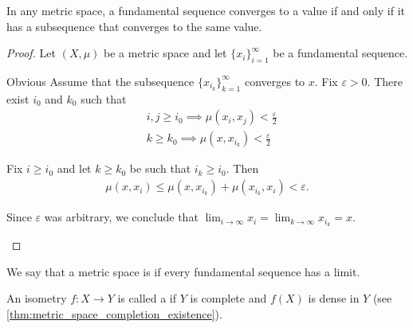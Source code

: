 \begin{proposition}\label{thm:fundamental_subsequence_convergence}
  In any metric space, a fundamental sequence converges to a value if and only if it has a subsequence that converges to the same value.
\end{proposition}
\begin{proof}
  Let \( (X, \mu) \) be a metric space and let \( \{ x_i \}_{i=1}^\infty \) be a fundamental sequence.

  \begin{description}
    \Implies Obvious
    \ImpliedBy Assume that the subsequence \( \{ x_{i_k} \}_{k=1}^\infty \) converges to \( x \). Fix \( \varepsilon > 0 \). There exist \( i_0 \) and \( k_0 \) such that
    \begin{align*}
      &i, j \geq i_0 \implies \mu(x_i, x_j) < \tfrac \varepsilon 2 \\
      &k \geq k_0 \implies \mu(x, x_{i_k}) < \tfrac \varepsilon 2
    \end{align*}

    Fix \( i \geq i_0 \) and let \( k \geq k_0 \) be such that \( i_k \geq i_0 \). Then
    \begin{align*}
      \mu(x, x_i) \leq \mu(x, x_{i_k}) + \mu(x_{i_k}, x_i) < \varepsilon.
    \end{align*}

    Since \( \varepsilon \) was arbitrary, we conclude that \( \lim_{i \to \infty} x_i = \lim_{k \to \infty} x_{i_k} = x \).
  \end{description}
\end{proof}

\begin{definition}\label{def:complete_metric_space}
  We say that a metric space is  if every fundamental sequence has a limit.

  An isometry \( f: X \to Y \) is called a  if \( Y \) is complete and \( f(X) \) is dense in \( Y \) (see \cref{thm:metric_space_completion_existence}).
\end{definition}

